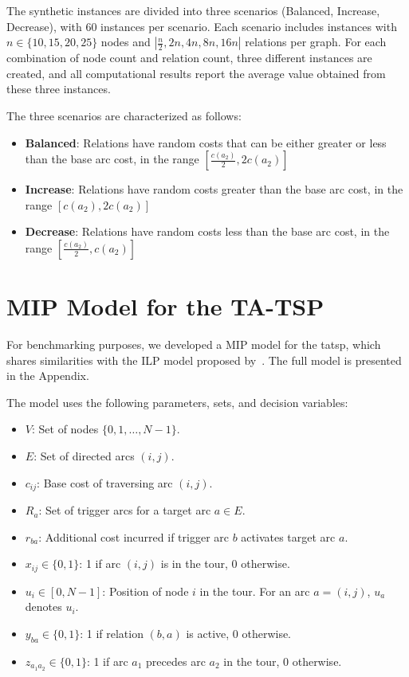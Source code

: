 \documentclass[twocolumn, switch]{article} %
\begin{document}
The synthetic instances are divided into three scenarios (Balanced, Increase, Decrease), with 60 instances per scenario. Each scenario includes instances with $n \in \{10, 15, 20, 25\}$ nodes and $|\frac{n}{2}, 2n, 4n, 8n, 16n|$ relations per graph. For each combination of node count and relation count, three different instances are created, and all computational results report the average value obtained from these three instances.

The three scenarios are characterized as follows:
\begin{itemize}
    \item \textbf{Balanced}: Relations have random costs that can be either greater or less than the base arc cost, in the range $[\frac{c(a_2)}{2}, 2c(a_2)]$
    \item \textbf{Increase}: Relations have random costs greater than the base arc cost, in the range $[c(a_2), 2c(a_2)]$
    \item \textbf{Decrease}: Relations have random costs less than the base arc cost, in the range $[\frac{c(a_2)}{2}, c(a_2)]$
\end{itemize}



\appendix
\section{MIP Model for the TA-TSP}
\label{sec:mip_model}
For benchmarking purposes, we developed a MIP model for the \gls{tatsp}, which shares similarities with the ILP model proposed by~\citet{Cerrone}.
The full model is presented in the Appendix.

The model uses the following parameters, sets, and decision variables:
\begin{itemize}
    \item $V$: Set of nodes $\{0, 1, \dots, N-1\}$.
    \item $E$: Set of directed arcs $(i,j)$.
    \item $c_{ij}$: Base cost of traversing arc $(i,j)$.
    \item $R_a$: Set of trigger arcs for a target arc $a \in E$.
    \item $r_{ba}$: Additional cost incurred if trigger arc $b$ activates target arc $a$.
    \item $x_{ij} \in \{0, 1\}$: 1 if arc $(i,j)$ is in the tour, 0 otherwise.
    \item $u_i \in [0, N-1]$: Position of node $i$ in the tour. For an arc $a=(i,j)$, $u_a$ denotes $u_i$.
    \item $y_{ba} \in \{0, 1\}$: 1 if relation $(b,a)$ is active, 0 otherwise.
    \item $z_{a_1a_2} \in \{0, 1\}$: 1 if arc $a_1$ precedes arc $a_2$ in the tour, 0 otherwise.
\end{itemize}
\end{document}
